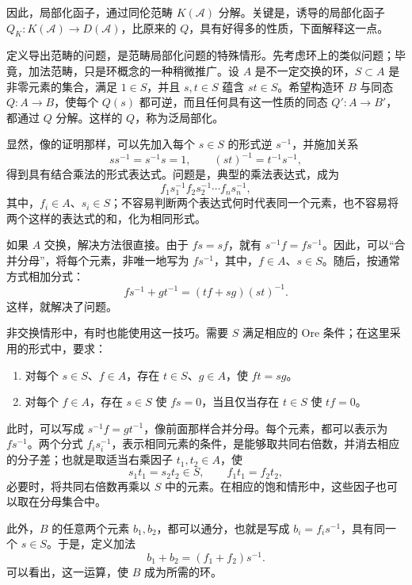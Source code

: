 因此，局部化函子，通过同伦范畴 $K(\mathcal{A})$ 分解。关键是，诱导的局部化函子 $Q_K\colon K(\mathcal{A})\to D(\mathcal{A})$，比原来的 $Q$，具有好得多的性质，下面解释这一点。

定义导出范畴的问题，是范畴局部化问题的特殊情形。先考虑环上的类似问题；毕竟，加法范畴，只是环概念的一种稍微推广。设 $A$ 是不一定交换的环，$S\subset A$ 是非零元素的集合，满足 $1\in S$，并且 $s,t\in S$ 蕴含 $st\in S$。希望构造环 $B$ 与同态 $Q\colon A\to B$，使每个 $Q(s)$ 都可逆，而且任何具有这一性质的同态 $Q'\colon A\to B'$，都通过 $Q$ 分解。这样的 $Q$，称为泛局部化。

显然，像的证明那样，可以先加入每个 $s\in S$ 的形式逆 $s^{-1}$，并施加关系
\[
ss^{-1}=s^{-1}s=1,\qquad(st)^{-1}=t^{-1}s^{-1},
\]
得到具有结合乘法的形式表达式。问题是，典型的乘法表达式，成为
\[
f_1s_1^{-1}f_2s_2^{-1}\cdots f_ns_n^{-1},
\]
其中，$f_i\in A$、$s_i\in S$；不容易判断两个表达式何时代表同一个元素，也不容易将两个这样的表达式的和，化为相同形式。

如果 $A$ 交换，解决方法很直接。由于 $fs=sf$，就有 $s^{-1}f=fs^{-1}$。因此，可以“合并分母”，将每个元素，非唯一地写为 $fs^{-1}$，其中，$f\in A$、$s\in S$。随后，按通常方式相加分式：
\[
fs^{-1}+gt^{-1}=(tf+sg)(st)^{-1}.
\]
这样，就解决了问题。

非交换情形中，有时也能使用这一技巧。需要 $S$ 满足相应的 Ore 条件；在这里采用的形式中，要求：
\begin{enumerate}[label=(\alph*)]
\item 对每个 $s\in S$、$f\in A$，存在 $t\in S$、$g\in A$，使 $ft=sg$。
\item 对每个 $f\in A$，存在 $s\in S$ 使 $fs=0$，当且仅当存在 $t\in S$ 使 $tf=0$。
\end{enumerate}
此时，可以写成 $s^{-1}f=gt^{-1}$，像前面那样合并分母。每个元素，都可以表示为 $fs^{-1}$。两个分式 $f_is_i^{-1}$，表示相同元素的条件，是能够取共同右倍数，并消去相应的分子差；也就是取适当右乘因子 $t_1,t_2\in A$，使
\[
s_1t_1=s_2t_2\in S,\qquad f_1t_1=f_2t_2,
\]
必要时，将共同右倍数再乘以 $S$ 中的元素。在相应的饱和情形中，这些因子也可以取在分母集合中。

此外，$B$ 的任意两个元素 $b_1,b_2$，都可以通分，也就是写成 $b_i=f_is^{-1}$，具有同一个 $s\in S$。于是，定义加法
\[
b_1+b_2=(f_1+f_2)s^{-1}.
\]
可以看出，这一运算，使 $B$ 成为所需的环。

